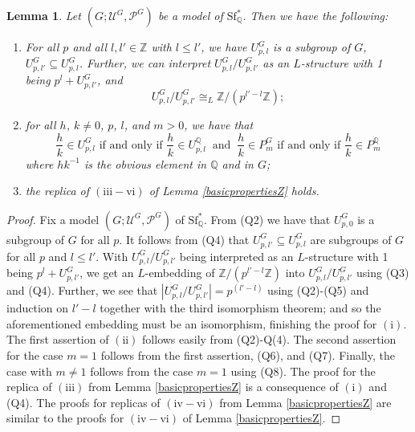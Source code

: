 \documentclass[letterpaper]{amsart}
\newcommand{\qq}{\mathbb{Q}}
\newcommand{\zz}{\mathbb{Z}}
\newcommand{\sU}{\mathscr{U}}
\newcommand{\sP}{\mathscr{P}}
\newcommand{\WSFQ}{\mathrm{Sf}^*_{\qq}}
\newtheorem{lem}[thm]{Lemma}
\begin{document}
\begin{lem} \label{basicpropertiesQ}
Let $(G; \sU^G, \sP^G)$ be a model of $\WSFQ$. Then we have the following:
\begin{enumerate}
\item[$\mathrm{(i)}$] For all $p$ and all  $l, l' \in \zz$ with $l\leq l'$, we have $U_{p,l}^G$ is a subgroup of $G$, $U_{p,l'}^G \subseteq U^G_{p,l}$. Further, we can interpret $U^G_{p, l} \slash U^G_{p, l'}$ as an $L$-structure with 1 being $p^l+U^G_{p, l'}$, and
$$U^G_{p, l} \slash U^G_{p, l'} \cong_{L} \zz\slash (p^{l'-l}\zz);$$
\item[$\mathrm{(ii)}$] for all $h$, $k\neq 0$, $p$, $l$, and $m>0$, we have  that
$$\frac{h}{k} \in U^G_{p,l} \text{ if and only if } \frac{h}{k} \in U^\qq_{p,l} \ \text{ and }\  \frac{h}{k} \in P^G_m \text{ if and only if } \frac{h}{k} \in P^\qq_m
$$
where $hk^{-1}$ is the obvious element in $\qq$ and in $G$;
\item[$\mathrm{(iii)}$] the replica of $\mathrm{(iii-vi)}$ of Lemma \ref{basicpropertiesZ} holds.
\begin{comment}
\item for all $h\neq 0 $,$p$, and $l$, we have that $ha \in U^G_{p,l}$  if and only if $ a \in U^G_{p,l-v_p(h)}; $
\item if $a\in G$ is in $U^G_{p, 2+v_p(m)}$, then $a \notin P^G_m$;
\item for all $h\neq 0$ and $m>0$, $ha \in P^G_{m}$ if and only if we have
$$ a \in P^G_{m} \ \text{ and }  \  a \notin U^G_{2+ v_p(m) -v_p(h)} \text{ for all } p \text{ which divides } h;$$
\item for all $h>0$ and $m>0$, $a \in P^G_{m}$ if and only if  $ha \in P^G_{mh}$. \qed
\end{comment}
\end{enumerate}
\end{lem}
\begin{proof}
Fix a model $(G; \sU^G, \sP^G)$ of $\WSFQ$. From (Q2) we have that $U_{p,0}^G$ is a subgroup of $G$ for all $p$. It follows from (Q4) that $U^G_{p,l'} \subseteq U^G_{p,l} $ are subgroups of $G$ for all $p$ and $l\leq l'$.  With $U^G_{p, l} \slash U^G_{p, l'}$ being interpreted as an $L$-structure with 1 being $p^l+U^G_{p, l'}$, we get an $L$-embedding of $ \zz\slash (p^{l'-l}\zz)$ into $U^G_{p, l} \slash U^G_{p, l'}$ using (Q3) and (Q4). Further, we see that $|U^G_{p, l} \slash U^G_{p, l'}|=p^{(l'-l)}$ using (Q2)-(Q5) and induction on $l'-l$ together with the third isomorphism theorem; and so the aforementioned embedding must be an isomorphism, finishing the proof for $\mathrm{(i)}$. The first assertion of $\mathrm{(ii)}$ follows easily from (Q2)-Q(4). The second assertion for the case $m=1$ follows from the first assertion, (Q6), and (Q7). Finally, the case with $m\not=1$ follows from the case $m=1$ using (Q8). The proof for the replica of $\mathrm{(iii)}$ from Lemma \ref{basicpropertiesZ}  is a consequence of $\mathrm{(i)}$ and (Q4). The proofs for replicas of $\mathrm{(iv-vi)}$ from Lemma \ref{basicpropertiesZ} are similar to the proofs for $\mathrm{(iv-vi)}$ of Lemma \ref{basicpropertiesZ}.
\end{proof}
\end{document}
